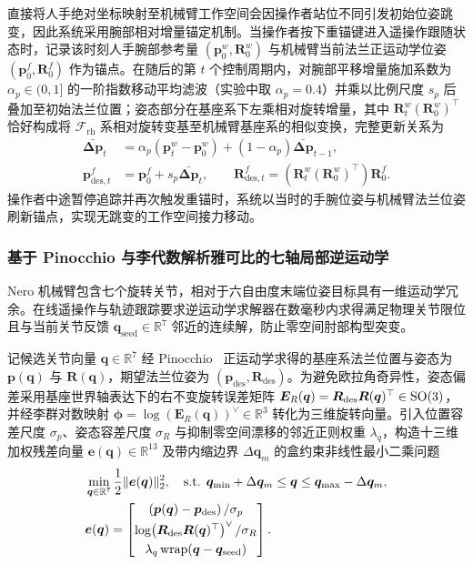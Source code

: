 直接将人手绝对坐标映射至机械臂工作空间会因操作者站位不同引发初始位姿跳变，因此系统采用腕部相对增量锚定机制。当操作者按下重锚键进入遥操作跟随状态时，记录该时刻人手腕部参考量 $(\bm{p}_0^{w}, \bm{R}_0^{w})$ 与机械臂当前法兰正运动学位姿 $(\bm{p}_0^{f}, \bm{R}_0^{f})$ 作为锚点。在随后的第 $t$ 个控制周期内，对腕部平移增量施加系数为 $\alpha_p \in (0, 1]$ 的一阶指数移动平均滤波（实验中取 $\alpha_p = 0.4$）并乘以比例尺度 $s_p$ 后叠加至初始法兰位置；姿态部分在基座系下左乘相对旋转增量，其中 $\bm{R}_t^{w}(\bm{R}_0^{w})^{\top}$ 恰好构成将 $\mathcal{F}_{\text{rh}}$ 系相对旋转变基至机械臂基座系的相似变换，完整更新关系为
\begin{align}
  \bar{\bm{\Delta p}}_t &= \alpha_p \left(\bm{p}_t^{w} - \bm{p}_0^{w}\right) + (1 - \alpha_p)\bar{\bm{\Delta p}}_{t-1}, \label{eq:wrist-ema}\\
  \bm{p}_{\text{des},t}^{f} &= \bm{p}_0^{f} + s_p \bar{\bm{\Delta p}}_t, \qquad
  \bm{R}_{\text{des},t}^{f} = \left(\bm{R}_t^{w}\left(\bm{R}_0^{w}\right)^{\top}\right)\bm{R}_0^{f}. \label{eq:wrist-relative-pose}
\end{align}
操作者中途暂停追踪并再次触发重锚时，系统以当时的手腕位姿与机械臂法兰位姿刷新锚点，实现无跳变的工作空间接力移动。

\subsubsection{基于 Pinocchio 与李代数解析雅可比的七轴局部逆运动学}

Nero 机械臂包含七个旋转关节，相对于六自由度末端位姿目标具有一维运动学冗余。在线遥操作与轨迹跟踪要求逆运动学求解器在数毫秒内求得满足物理关节限位且与当前关节反馈 $\bm{q}_{\text{seed}} \in \mathbb{R}^7$ 邻近的连续解，防止零空间肘部构型突变。

记候选关节向量 $\bm{q} \in \mathbb{R}^7$ 经 Pinocchio~\cite{carpentier2019pinocchio} 正运动学求得的基座系法兰位置与姿态为 $\bm{p}(\bm{q})$ 与 $\bm{R}(\bm{q})$，期望法兰位姿为 $(\bm{p}_{\text{des}}, \bm{R}_{\text{des}})$。为避免欧拉角奇异性，姿态偏差采用基座世界轴表达下的右不变旋转误差矩阵 $\bm{E}_R(\bm{q}) = \bm{R}_{\text{des}}\bm{R}(\bm{q})^{\top} \in \mathrm{SO}(3)$，并经李群对数映射 $\bm{\phi} = \log(\bm{E}_R(\bm{q}))^{\vee} \in \mathbb{R}^3$ 转化为三维旋转向量。引入位置容差尺度 $\sigma_p$、姿态容差尺度 $\sigma_R$ 与抑制零空间漂移的邻近正则权重 $\lambda_q$，构造十三维加权残差向量 $\bm{e}(\bm{q}) \in \mathbb{R}^{13}$ 及带内缩边界 $\Delta\bm{q}_m$ 的盒约束非线性最小二乘问题
\begin{align}
  &\min_{\bm{q} \in \mathbb{R}^7} \frac{1}{2}\|\bm{e}(\bm{q})\|_2^2, \quad \text{s.t. } \bm{q}_{\min} + \Delta\bm{q}_m \le \bm{q} \le \bm{q}_{\max} - \Delta\bm{q}_m, \notag\\
  &\bm{e}(\bm{q}) = \begin{bmatrix}
    \left(\bm{p}(\bm{q}) - \bm{p}_{\text{des}}\right) / \sigma_p \\[3pt]
    \log\!\left(\bm{R}_{\text{des}}\bm{R}(\bm{q})^{\top}\right)^{\vee} / \sigma_R \\[3pt]
    \lambda_q \operatorname{wrap}\!\left(\bm{q} - \bm{q}_{\text{seed}}\right)
  \end{bmatrix}.
  \label{eq:nero-ik-lsq}
\end{align}

